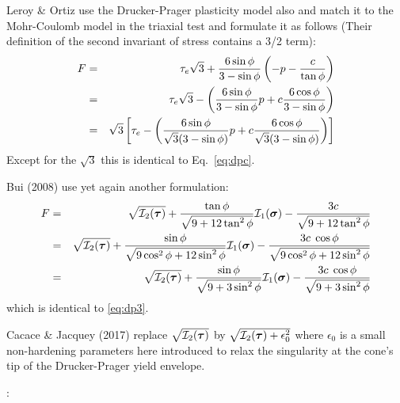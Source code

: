\vspace{1.3cm}
\begin{remark}
Leroy \& Ortiz \cite{leor89} use the Drucker-Prager plasticity model also and match it to the Mohr-Coulomb model in the 
triaxial test and formulate it as follows 
(Their definition of the second invariant of stress contains a 3/2 term):
\begin{eqnarray}
F 
&=& \tau_e \sqrt{3} + \frac{6 \sin\phi}{3-\sin\phi} \left( -p  - \frac{c}{\tan \phi} \right) \nonumber\\
&=& \tau_e \sqrt{3} - \left( \frac{6 \sin\phi}{3-\sin\phi}  p  + c \frac{6 \cos\phi}{3-\sin\phi} \right) \nonumber\\
&=& \sqrt{3} \left[ \tau_e  - \left( \frac{6 \sin\phi}{\sqrt{3}(3-\sin\phi)}  p  + c \frac{6 \cos\phi}{\sqrt{3}(3-\sin\phi)} \right)  \right]
\end{eqnarray}
Except for the $\sqrt{3}$ this is identical to Eq.~\eqref{eq:dpc}.
\end{remark}

\begin{remark}
Bui \etal (2008) \cite{bufs08} use yet again another formulation:
\begin{eqnarray}
F 
&=& \sqrt{{\cal I}_2({\bm \tau})} + \frac{\tan \phi}{\sqrt{9 + 12 \tan^2 \phi}} {\cal I}_1({\bm \sigma})
- \frac{3 c}{\sqrt{9 + 12 \tan^2 \phi}} \nonumber\\
&=& \sqrt{{\cal I}_2({\bm \tau})} + \frac{\sin \phi}{\sqrt{9\cos^2 \phi + 12 \sin^2 \phi}} {\cal I}_1({\bm \sigma}) - \frac{3 c \; \cos\phi}{\sqrt{9\cos^2\phi + 12 \sin^2 \phi}} \nonumber\\
&=& \sqrt{{\cal I}_2({\bm \tau})} + \frac{\sin \phi}{\sqrt{9 + 3 \sin^2 \phi}} {\cal I}_1({\bm \sigma}) - \frac{3 c \; \cos\phi}{\sqrt{9 + 3\sin^2 \phi}} \nonumber
\end{eqnarray}
which is identical to \eqref{eq:dp3}.
\end{remark}

\begin{remark}
Cacace \& Jacquey (2017) \cite{caja17} replace $\sqrt{{\cal I}_2({\bm \tau})}$ by 
$\sqrt{{\cal I}_2({\bm \tau})+\epsilon_0^2}$ where $\epsilon_0$ is a small non-hardening parameters 
here introduced to relax the singularity at the cone's tip of the Drucker-Prager yield envelope.
\end{remark}

\Literature:


